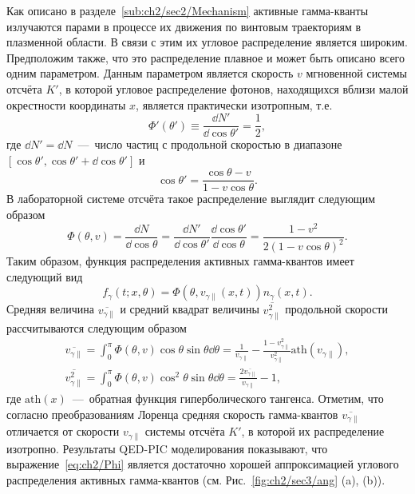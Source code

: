 Как описано в разделе~\ref{sub:ch2/sec2/Mechanism} активные гамма-кванты излучаются парами в процессе их движения по винтовым траекториям в плазменной области.
В связи с этим их угловое распределение является широким.
Предположим также, что это распределение плавное и может быть описано всего одним параметром.
Данным параметром является скорость $v$ мгновенной системы отсчёта $K'$, в которой угловое распределение фотонов, находящихся вблизи малой окрестности координаты $x$, является практически изотропным, т.е.
\begin{equation}
    \Phi'(\theta') \equiv \frac{\dd N'}{\dd \cos\theta'} = \frac{1}{2},
\end{equation}
где $\dd N'=\dd N$~---~число частиц с продольной скоростью в диапазоне $[\cos\theta', \cos\theta'+\dd\cos\theta']$ и
\begin{equation}
    \cos\theta' = \frac{\cos\theta - v}{1 - v \cos\theta}.
\end{equation}
В лабораторной системе отсчёта такое распределение выглядит следующим образом~\cite{LandauII}
\begin{equation}
    \label{eq:ch2/Phi}
    \Phi(\theta, v) = \frac{\dd N}{\dd \cos\theta} = \frac{\dd N'}{\dd \cos\theta'} \frac{\dd \cos\theta'}{\dd \cos\theta} = \frac{1-v^2}{{2\left( 1 - v \cos{\theta}  \right)}^2}.
\end{equation}
Таким образом, функция распределения активных гамма-квантов имеет следующий вид
\begin{equation}
    f_\gamma(t; x,\theta)=\Phi\left(\theta, v_{\gamma\parallel}(x,t)\right) n_\gamma(x,t).
\end{equation}
Средняя величина $\overline{v_{\gamma\parallel}}$ и средний квадрат величины $\overline{v_{\gamma\parallel}^2}$ продольной скорости рассчитываются следующим образом
\begin{align}
    \label{eq:ch2/av_vx}
    \overline{v_{\gamma\parallel}}=\int_0^\pi \Phi(\theta, v) \cos{\theta} \sin{\theta}\dd\theta = \frac{1}{v_{\gamma\parallel}} - \frac{1-v_{\gamma\parallel}^2}{v_{\gamma\parallel}^2}\text{ath}(v_{\gamma\parallel}) , \\
    \overline{v_{\gamma\parallel}^2}=\int_0^\pi \Phi(\theta, v) \cos^2{\theta} \sin{\theta}\dd\theta = \frac{2\overline{v_{\gamma\parallel}}}{v_{\gamma\parallel}} - 1 ,
\end{align}
где $\text{ath}(x)$~---~обратная функция гиперболического тангенса.
Отметим, что согласно преобразованиям Лоренца средняя скорость гамма-квантов $\overline{v_{\gamma\parallel}}$ отличается от скорости $v_{\gamma\parallel}$ системы отсчёта $K'$, в которой их распределение изотропно.
Результаты QED-PIC моделирования показывают, что выражение~\eqref{eq:ch2/Phi} является достаточно хорошей аппроксимацией углового распределения активных гамма-квантов (см. Рис.~\ref{fig:ch2/sec3/ang} (a), (b)).

